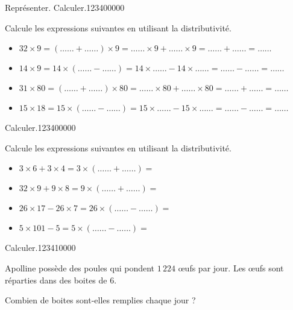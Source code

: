 \begin{pageAD}

\begin{ExoCad}{Représenter. Calculer.}{1234}{0}{0}{0}{0}{0}

Calcule les expressions suivantes en utilisant la distributivité.

\begin{itemize}[leftmargin=*]
\item $32 \times 9= (\ldots \ldots + \ldots \ldots) \times 9  = \ldots \ldots \times 9 + \ldots \ldots \times 9 = \ldots \ldots   + \ldots \ldots  = \ldots \ldots $ \vspace{0.1cm}
\item  $14 \times 9 = 14 \times (\ldots \ldots - \ldots \ldots)= 14\times \ldots \ldots - 14 \times \ldots \ldots = \ldots \ldots   - \ldots \ldots  = \ldots \ldots $ \vspace{0.1cm}
\item $31 \times 80 = (\ldots \ldots + \ldots \ldots) \times 80  = \ldots \ldots \times 80 + \ldots \ldots \times 80 = \ldots \ldots   + \ldots \ldots  = \ldots \ldots $ \vspace{0.1cm}
\item  $15 \times 18 = 15 \times (\ldots \ldots - \ldots \ldots)= 15\times \ldots \ldots - 15 \times \ldots \ldots = \ldots \ldots   - \ldots \ldots  = \ldots \ldots $ \vspace{0.1cm}
\end{itemize}
 
\end{ExoCad}

\begin{ExoCad}{Calculer.}{1234}{0}{0}{0}{0}{0}

Calcule les expressions suivantes en utilisant la distributivité.

\begin{itemize}[leftmargin=*]
\item  $3 \times 6 + 3 \times 4=3 \times (\ldots \ldots + \ldots \ldots)=$ 
\item $32 \times 9 + 9 \times 8=9 \times (\ldots \ldots + \ldots \ldots)=$ 
\item  $26 \times 17 - 26 \times 7=26 \times (\ldots \ldots - \ldots \ldots)=$ 
\item  $5 \times 101 - 5=5 \times (\ldots \ldots - \ldots \ldots)=$ 
\end{itemize}
 
\end{ExoCad}



\begin{ExoCad}{Calculer.}{1234}{1}{0}{0}{0}{0}

Apolline possède des poules qui pondent $1\,224$ œufs par jour. 
Les œufs sont réparties dans des boites de 6. 

Combien de boites sont-elles remplies chaque jour ? 
\end{ExoCad}

\end{pageAD}
 


